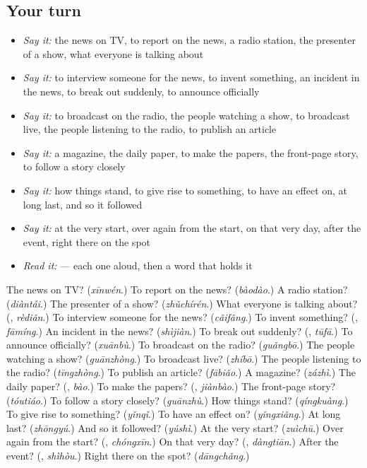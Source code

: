 \subsection*{Your turn}
\begin{itemize}
\raggedright
  \item \emph{Say it:} the news on TV, to report on the news, a radio station, the presenter of a show, what everyone is talking about
  \item \emph{Say it:} to interview someone for the news, to invent something, an incident in the news, to break out suddenly, to announce officially
  \item \emph{Say it:} to broadcast on the radio, the people watching a show, to broadcast live, the people listening to the radio, to publish an article
  \item \emph{Say it:} a magazine, the daily paper, to make the papers, the front-page story, to follow a story closely
  \item \emph{Say it:} how things stand, to give rise to something, to have an effect on, at long last, and so it followed
  \item \emph{Say it:} at the very start, over again from the start, on that very day, after the event, right there on the spot
  \item \emph{Read it:}    — each one aloud, then a word that holds it
\end{itemize}

\begin{tcolorbox}[breakable,colback=teal!4,colframe=teal!35!black,title={Before you move on}]
The news on TV? (\emph{xīnwén}.) To report on the news? (\emph{bàodào}.) A radio station? (\emph{diàntái}.) The presenter of a show? (\emph{zhǔchírén}.) What everyone is talking about? (\textbf{}, \emph{rèdiǎn}.) To interview someone for the news? (\emph{cǎifǎng}.) To invent something? (\textbf{}, \emph{fāmíng}.) An incident in the news? (\emph{shìjiàn}.) To break out suddenly? (\textbf{}, \emph{tūfā}.) To announce officially? (\emph{xuānbù}.) To broadcast on the radio? (\emph{guǎngbō}.) The people watching a show? (\emph{guānzhòng}.) To broadcast live? (\emph{zhíbō}.) The people listening to the radio? (\emph{tīngzhòng}.) To publish an article? (\emph{fābiǎo}.) A magazine? (\emph{zázhì}.) The daily paper? (\textbf{}, \emph{bào}.) To make the papers? (\textbf{}, \emph{jiànbào}.) The front-page story? (\emph{tóutiáo}.) To follow a story closely? (\emph{guānzhù}.) How things stand? (\emph{qíngkuàng}.) To give rise to something? (\emph{yǐnqǐ}.) To have an effect on? (\emph{yǐngxiǎng}.) At long last? (\emph{zhōngyú}.) And so it followed? (\emph{yúshì}.) At the very start? (\emph{zuìchū}.) Over again from the start? (\textbf{}, \emph{chóngxīn}.) On that very day? (\textbf{}, \emph{dàngtiān}.) After the event? (\textbf{}, \emph{shìhòu}.) Right there on the spot? (\emph{dāngchǎng}.)
\end{tcolorbox}
